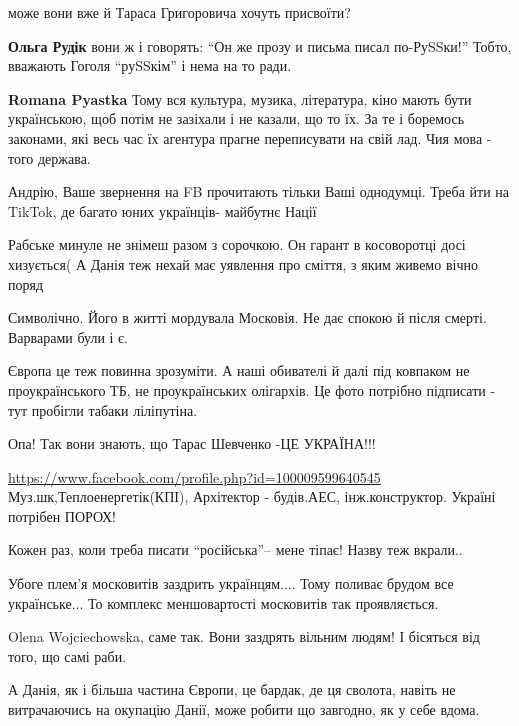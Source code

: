 \begin{itemize}
може вони вже й Тараса Григоровича хочуть присвоїти?


\textbf{Ольга Рудік} вони ж і говорять: \enquote{Он же прозу и письма писал
по-РуSSки!} Тобто, вважають Гоголя \enquote{руSSкім} і нема на то ради.

\textbf{Romana Pyastka} Тому вся культура, музика, література, кіно мають бути
українською, щоб потім не зазіхали і не казали, що то їх. За те і боремось
законами, які весь час їх агентура прагне переписувати на свій лад. Чия мова -
того держава.


Андрію, Ваше звернення на FB прочитають тільки Ваші однодумці. Треба йти на
TikTok, де багато юних українців- майбутнє Нації


Рабське минуле не знімеш разом з сорочкою. Он гарант в косоворотці досі
хизується( А Данія теж нехай має уявлення про сміття, з яким живемо вічно поряд


Символічно. Його в житті мордувала Московія. Не дає спокою й після смерті.
Варварами були і є.


Європа це теж повинна зрозуміти. А наші обивателі й далі під ковпаком не
проукраїнського ТБ, не проукраїнських олігархів. Це фото потрібно підписати -
тут пробігли табаки ліліпутіна.


Опа! Так вони знають, що Тарас Шевченко -ЦЕ УКРАЇНА!!!

\url{https://www.facebook.com/profile.php?id=100009599640545}
Муз.шк,Теплоенергетік(КПІ), Архітектор - будів.АЕС, інж.конструктор. Україні потрібен ПОРОХ!

Кожен раз, коли треба писати \enquote{російська}-- мене тіпає! Назву теж вкрали..

Убоге плем'я московитів заздрить українцям.... Тому поливає брудом все українське... То комплекс меншовартості московитів так проявляється.

Olena Wojciechowska, саме так. Вони заздрять вільним людям! І бісяться від того, що самі раби.

А Данія, як і більша частина Європи, це бардак, де ця сволота, навіть не витрачаючись на окупацію Данії, може робити що завгодно, як у себе вдома.


\end{itemize}
